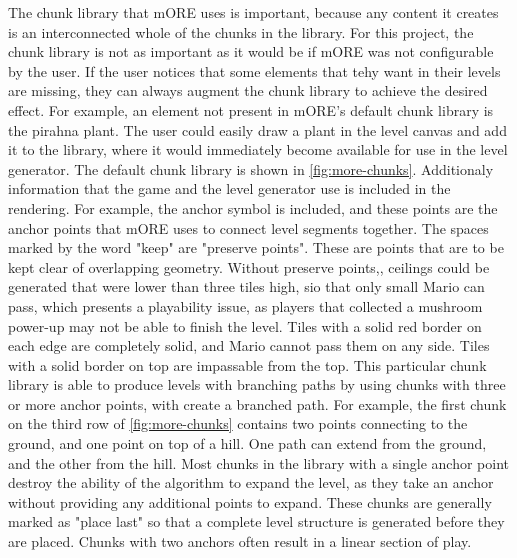 The chunk library that mORE uses is important, because any content it creates is an
interconnected whole of the chunks in the library. For this project, the chunk library is
not as important as it would be if mORE was not configurable by the user. If the user notices
that some elements that tehy want in their levels are missing, they can always augment the
chunk library to achieve the desired effect. For example, an element not present in mORE's
default chunk library is the pirahna plant. The user could easily draw a plant in the level
canvas and add it to the library, where it would immediately become available for use in the
level generator. The default chunk library is shown in \autoref{fig:more-chunks}. 
Additionaly information that the game and the level generator use is included in the rendering.
For example, the anchor symbol is included, and these points are the anchor points that mORE
uses to connect level segments together. The spaces marked by the word "keep" are 
"preserve points". These are points that are to be kept clear of overlapping geometry. 
Without preserve points,, ceilings could be generated that were lower than three tiles high,
sio that only small Mario can pass, which presents a playability issue, as players that
collected a mushroom power-up may not be able to finish the level. Tiles with a solid red
border on each edge are completely solid, and Mario cannot pass them on any side. Tiles with
a solid border on top are impassable from the top. This particular chunk library is able to
produce levels with branching paths by using chunks with three or more anchor points, with
create a branched path. For example, the first chunk on the third row of \autoref{fig:more-chunks}
contains two points connecting to the ground, and one point on top of a hill. One path can
extend from the ground, and the other from the hill. Most chunks in the library with a single 
anchor point destroy the ability of the algorithm to expand the level, as they take an anchor
without providing any additional points to expand. These chunks are generally marked as
"place last" so that a complete level structure is generated before they are placed. Chunks 
with two anchors often result in a linear section of play.


